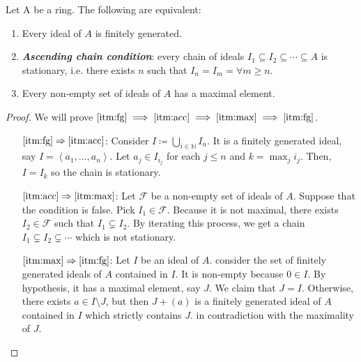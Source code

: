 \begin{theorem}
    Let A be a ring.
    The following are equivalent:
    \begin{enumerate}

        \item \label{itm:fg}
        Every ideal of $A$ is finitely generated.

        \item \label{itm:acc}
        \emph{\textbf{Ascending chain condition}}:
        every chain of ideals $I_1 \subseteq I_2 \subseteq \cdots \subseteq A$
        is stationary, i.e.
        there exists $n$ such that $I_n = I_{m} = \forall m \geq n$.

        \item \label{itm:max}
        Every non-empty set of ideals of $A$ has a maximal element.

    \end{enumerate}

    \begin{proof}
        We will prove $ \eqref{itm:fg} \implies \eqref{itm:acc} \implies \eqref{itm:max} \implies \eqref{itm:fg}$.
        \begin{itemize}[align=left]

            \item[$\eqref{itm:fg} \Rightarrow \eqref{itm:acc}$:]
            Consider $I \coloneqq \bigcup_{i \in \mathbb{N}} I_n$.
            It is a finitely generated ideal, say $I = \left<a_1, \dots, a_n\right>$.
            Let $a_j \in I_{i_j}$ for each $j \leq n$ and $k = \max_j i_j$.
            Then, $I = I_k$ so the chain is stationary.

            \item[$\eqref{itm:acc} \Rightarrow \eqref{itm:max}$:]
            Let $\mathcal{F}$ be a non-empty set of ideals of $A$.
            Suppose that the condition is false.
            Pick $I_1 \in \mathcal{F}$.
            Because it is not maximal, there exists $I_2 \in \mathcal{F}$ such that $I_1 \subsetneq I_2$.
            By iterating this process, we get a chain $I_1 \subsetneq I_2 \subsetneq \cdots$ which is not stationary.

            \item[$\eqref{itm:max} \Rightarrow \eqref{itm:fg}$:]
            Let $I$ be an ideal of $A$.
            consider the set of finitely generated ideals of $A$ contained in $I$.
            It is non-empty because $0 \in I$.
            By hypothesis, it has a maximal element, say $J$.
            We claim that $J = I$.
            Otherwise,
            there exists $a \in I \setminus J$,
            but then $J + (a)$ is a finitely generated ideal of $A$ contained in
            $I$ which strictly contains $J$.
            in contradiction with the maximality of $J$.
        \end{itemize}
    \end{proof}
\end{theorem}


